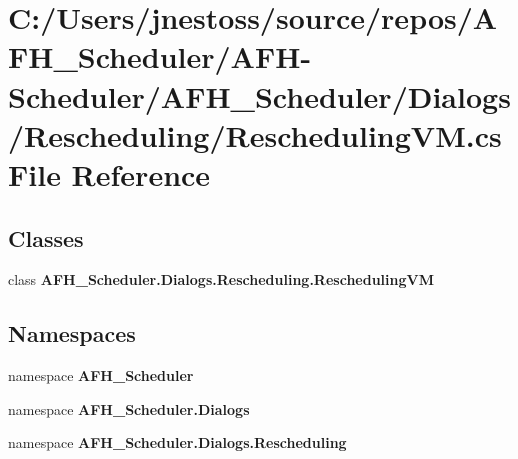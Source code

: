 \section{C\+:/\+Users/jnestoss/source/repos/\+A\+F\+H\+\_\+\+Scheduler/\+A\+F\+H-\/\+Scheduler/\+A\+F\+H\+\_\+\+Scheduler/\+Dialogs/\+Rescheduling/\+Rescheduling\+VM.cs File Reference}
\label{_rescheduling_v_m_8cs}
\subsection*{Classes}
\begin{DoxyCompactItemize}
\item 
class \textbf{ A\+F\+H\+\_\+\+Scheduler.\+Dialogs.\+Rescheduling.\+Rescheduling\+VM}
\end{DoxyCompactItemize}
\subsection*{Namespaces}
\begin{DoxyCompactItemize}
\item 
namespace \textbf{ A\+F\+H\+\_\+\+Scheduler}
\item 
namespace \textbf{ A\+F\+H\+\_\+\+Scheduler.\+Dialogs}
\item 
namespace \textbf{ A\+F\+H\+\_\+\+Scheduler.\+Dialogs.\+Rescheduling}
\end{DoxyCompactItemize}
